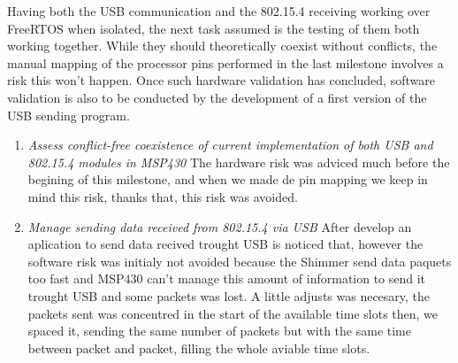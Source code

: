 		
		Having both the USB communication and the 802.15.4 receiving working over FreeRTOS when isolated, the next task assumed is the testing of them both working together. While they should theoretically coexist without conflicts, the manual mapping of the processor pins performed in the last milestone involves a risk this won't happen. Once such hardware validation has concluded, software validation is also to be conducted by the development of a first version of the USB sending program.

		\begin{enumerate}
		\item\emph{Assess conflict-free coexistence of current implementation of both USB and 802.15.4 modules in MSP430}
		The hardware risk was adviced much before the begining of this milestone, and when we made de pin mapping we keep in mind this risk, thanks that, this risk was avoided.\\

		\item\emph{Manage sending data received from 802.15.4 via USB}
		After develop an aplication to send data recived trought USB is noticed that, however the software risk was initialy not avoided because the Shimmer send data paquets too fast and MSP430 can't manage this amount of information to send it trought USB and some packets was lost. A little adjusts was necesary, the packets sent was concentred in the start of the available time slots then, we spaced it, sending the same number of packets but with the same time between packet and packet, filling the whole aviable time slots. \\
		\end{enumerate}
	

